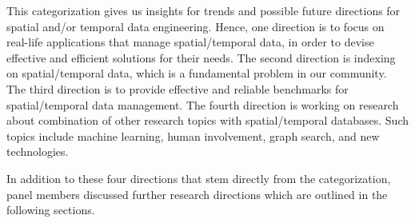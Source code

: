\documentclass[11pt,dvipdfm]{article}
\begin{document}
   This categorization gives us insights for trends and possible future directions for spatial and/or temporal data engineering. Hence, one direction is to focus on real-life applications that manage spatial/temporal data, in order to devise effective and efficient solutions for their needs. The second direction is indexing on spatial/temporal data, which is a fundamental problem in our community. The third direction is to provide effective and reliable benchmarks for spatial/temporal data management. The fourth direction is working on research about combination of other research topics with spatial/temporal databases. Such topics include machine learning, human involvement, graph search, and new technologies.

  In addition to these four directions that stem directly from the categorization, panel members discussed further research directions 
  which are outlined in the following sections.
\end{document}
